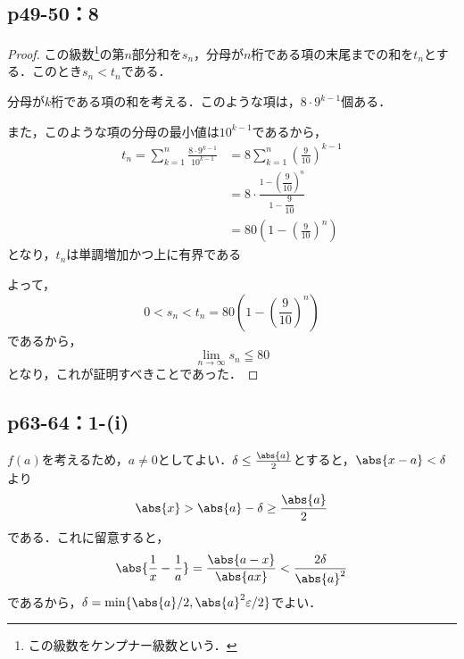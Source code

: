 \documentclass[uplatex,dvipdfmx,a4paper,10pt,fleqn]{jsarticle}
\begin{document}
    \newpage 

    \subsection*{p49-50：8}

    \begin{tleftbar}
        \begin{proof}
        この級数\footnote{この級数をケンプナー級数という．}の第$n$部分和を$s_n$，分母が$n$桁である項の末尾までの和を$t_n$とする．このとき$s_n < t_n$である．

        分母が$k$桁である項の和を考える．このような項は，$8 \cdot 9^{k-1}$個ある．
        
        また，このような項の分母の最小値は$10^{k-1}$であるから，
        \begin{align*} 
            t_n = \sum_{k=1}^{n} \frac{8 \cdot 9^{k-1}}{10^{k-1}} &= 8 \sum_{k=1}^{n} \left(\frac{9}{10}\right)^{k-1} \\
            &= 8 \cdot \frac{1-\left(\dfrac{9}{10}\right)^n}{1-\dfrac{9}{10}} \\
            & = 80 \left(1-\left(\frac{9}{10}\right)^n\right)
        \end{align*}
        となり，$t_n$は単調増加かつ上に有界である

        よって，
        \[
            0 < s_n < t_n = 80 \left(1-\left(\frac{9}{10}\right)^n\right)
        \]
        であるから，
        \[
            \lim_{n \to \infty} s_n \leqq 80
        \]
        となり，これが証明すべきことであった．
    \end{proof}
\end{tleftbar}


    \newpage 


    \subsection*{p63-64：1-(i)}

\begin{tleftbar}
    $f(a)$を考えるため，$a \ne 0$としてよい．$\delta \le \frac{\abs{a}}{2}$とすると，$\abs{x-a}<\delta$より
    \[
       \abs{x} > \abs{a}-\delta \ge \frac{\abs{a}}{2}
    \]
    である．これに留意すると，
    \[
        \abs{\frac{1}{x}-\frac{1}{a}}=\frac{\abs{a-x}}{\abs{ax}} <\frac{2 \delta}{\abs{a}^2}
    \]
    であるから，$\delta = \min \{ \abs{a}/2,\abs{a}^2\varepsilon/2 \}$でよい．
\end{tleftbar}
\end{document}
